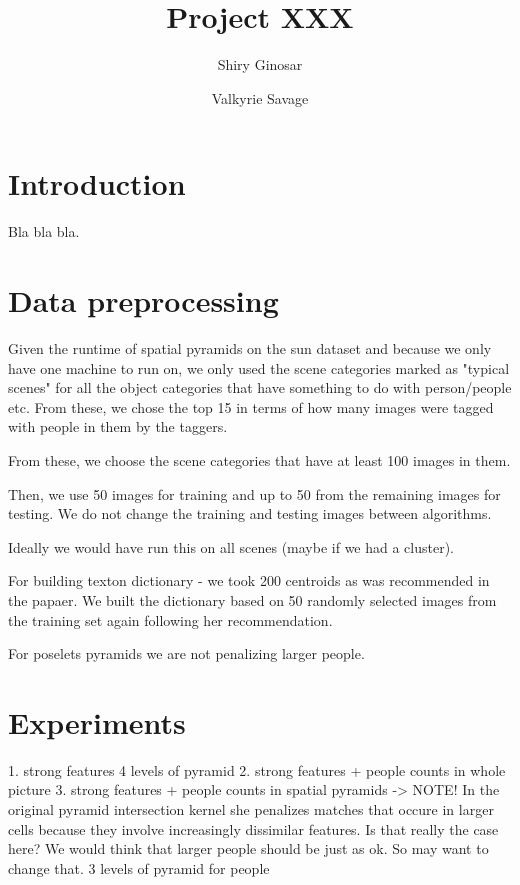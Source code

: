 \documentclass[11pt]{article}
\begin{document}
\title{Project XXX}
\author{Shiry Ginosar \and Valkyrie Savage}

\maketitle


\section{Introduction}
Bla bla bla.

\section{Data preprocessing}
Given the runtime of spatial pyramids on the sun dataset and because we only have one machine to run on, we only used the scene categories marked as "typical scenes" for all the object categories that have something to do with person/people etc. From these, we chose the top 15 in terms of how many images were tagged with people in them by the taggers.

From these, we choose the scene categories that have at least 100 images in them.

Then, we use 50 images for training and up to 50 from the remaining images for testing. We do not change the training and testing images between algorithms.

Ideally we would have run this on all scenes (maybe if we had a cluster).

For building texton dictionary - we took 200 centroids as was recommended in the papaer. We built the dictionary based on 50 randomly selected images from the training set again following her recommendation.

For poselets pyramids we are not penalizing larger people.

\section{Experiments}
1. strong features 4 levels of pyramid
2. strong features + people counts in whole picture
3. strong features + people counts in spatial pyramids -> NOTE! In the original pyramid intersection kernel she penalizes matches that occure in larger cells because they involve increasingly dissimilar features. Is that really the case here? We would think that larger people should be just as ok. So may want to change that.
3 levels of pyramid for people



\end{document}
